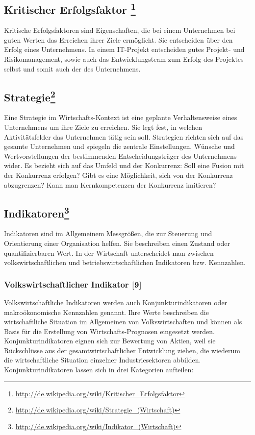 \subsection[Kritischer Erfolgsfaktor]{Kritischer Erfolgsfaktor \footnote{\url{ http://de.wikipedia.org/wiki/Kritischer_Erfolgsfaktor}}}

Kritische Erfolgsfaktoren sind Eigenschaften, die bei einem Unternehmen bei guten Werten das Erreichen ihrer Ziele ermöglicht. Sie entscheiden über den Erfolg eines Unternehmens. In einem IT-Projekt entscheiden gutes Projekt- und Risikomanagement, sowie auch das Entwicklungsteam zum Erfolg des Projektes selbst und somit auch der des Unternehmens.



\subsection[Strategie]{Strategie\footnote{\url{ http://de.wikipedia.org/wiki/Strategie_(Wirtschaft)}}}
Eine Strategie im Wirtschafts-Kontext ist eine geplante Verhaltensweise eines Unternehmens um ihre Ziele zu erreichen. Sie legt fest, in welchen Aktivitätsfelder das Unternehmen tätig sein soll. Strategien richten sich auf das gesamte Unternehmen und spiegeln die zentrale Einstellungen, Wünsche und Wertvorstellungen der bestimmenden Entscheidungsträger des Unternehmens wider. Es bezieht sich auf das Umfeld und der Konkurrenz: Soll eine Fusion mit der Konkurrenz erfolgen? Gibt es eine Möglichkeit, sich von der Konkurrenz abzugrenzen? Kann man Kernkompetenzen der Konkurrenz imitieren? 



\subsection[Indikatoren]{Indikatoren\footnote{\url{ http://de.wikipedia.org/wiki/Indikator_(Wirtschaft)}}}

Indikatoren sind im Allgemeinem Messgrößen, die zur Steuerung und Orientierung einer Organisation helfen. Sie beschreiben einen Zustand oder quantifizierbaren Wert. In der Wirtschaft unterscheidet man zwischen volkswirtschaftlichen und betriebswirtschaftlichen Indikatoren bzw. Kennzahlen.

\subsubsection{Volkswirtschaftlicher Indikator [9]}

Volkswirtschaftliche Indikatoren werden auch Konjunkturindikatoren oder makroökonomische Kennzahlen genannt. Ihre Werte beschreiben die wirtschaftliche Situation im Allgemeinen von Volkswirtschaften und können als Basis für die Erstellung von Wirtschafts-Prognosen eingesetzt werden. 
\\
Konjunkturindikatoren eignen sich zur Bewertung von Aktien, weil sie Rück\-schlüsse aus der gesamtwirtschaftlicher Entwicklung ziehen, die wiederum die wirtschaftliche Situation einzelner Industriesektoren abbilden. Konjunkturindikatoren lassen sich in drei Kategorien aufteilen:

